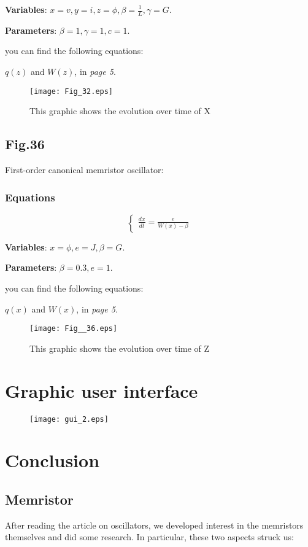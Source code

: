 \documentclass[12pt, a4paper]{paper}
\begin{document}
\textbf{Variables}: $x=v, y=i, z=\phi, 
\beta=\frac{1}{L}, \gamma=G$.

\textbf{Parameters}: $\beta =1, \gamma =1, c=1$.

you can find the following equations:

$q(z)$ and $W(z)$, in \textit{page 5}.

\begin{figure}[h]
\centering
\texttt{[image: Fig\_32.eps]}
\caption{This graphic shows the evolution over time of X}
\end{figure}

\newpage
\subsection{Fig.36}
First-order canonical memristor oscillator:
\subsubsection{Equations}
\begin{equation}
\begin{cases}
\frac{dx}{dt}=\frac{e}{W(x)-\beta}
\end{cases}
\end{equation}

\textbf{Variables}: $x=\phi, e=J, \beta=G$.

\textbf{Parameters}: $\beta =0.3, e=1$.

you can find the following equations:

$q(x)$ and $W(x)$, in \textit{page 5}.



\begin{figure}[h]
\centering
\texttt{[image: Fig\_\_36.eps]}
\caption{This graphic shows the evolution over time of Z}
\end{figure}

\newpage
\section{Graphic user interface}
\begin{figure}[h]
\centering
\texttt{[image: gui\_2.eps]}
\end{figure}

\newpage
\section{Conclusion}
\subsection{Memristor}
After reading the article on oscillators, we  developed interest in the memristors themselves and did some research.  In particular, these two aspects struck us:
\end{document}

